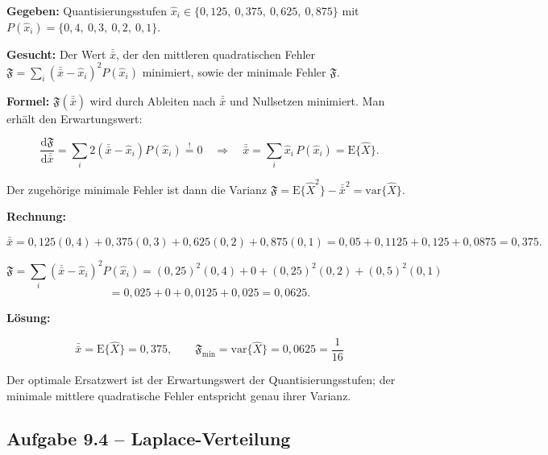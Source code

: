 \begin{beispiel}

\textbf{Gegeben:} Quantisierungsstufen
$\hat{x}_i \in \{0{,}125,\ 0{,}375,\ 0{,}625,\ 0{,}875\}$ mit
$P(\hat{x}_i) = \{0{,}4,\ 0{,}3,\ 0{,}2,\ 0{,}1\}$.

\textbf{Gesucht:} Der Wert $\bar{\bar{x}}$, der den mittleren quadratischen
Fehler $\mathfrak{F} = \sum_i (\bar{\bar{x}} - \hat{x}_i)^2 P(\hat{x}_i)$
minimiert, sowie der minimale Fehler $\mathfrak{F}$.

\textbf{Formel:} $\mathfrak{F}(\bar{\bar{x}})$ wird durch Ableiten nach
$\bar{\bar{x}}$ und Nullsetzen minimiert. Man erhält den Erwartungswert:

$$
\frac{\mathrm{d}\mathfrak{F}}{\mathrm{d}\bar{\bar{x}}}
= \sum_i 2(\bar{\bar{x}} - \hat{x}_i) P(\hat{x}_i) \overset{!}{=} 0
\quad\Longrightarrow\quad
\bar{\bar{x}} = \sum_i \hat{x}_i\, P(\hat{x}_i) = \mathrm{E}\{\hat{X}\}.
$$

Der zugehörige minimale Fehler ist dann die Varianz
$\mathfrak{F} = \mathrm{E}\{\hat{X}^2\} - \bar{\bar{x}}^2 = \mathrm{var}\{\hat{X}\}$.

\textbf{Rechnung:}

$$
\bar{\bar{x}} = 0{,}125(0{,}4) + 0{,}375(0{,}3) + 0{,}625(0{,}2) + 0{,}875(0{,}1)
= 0{,}05 + 0{,}1125 + 0{,}125 + 0{,}0875 = 0{,}375.
$$

$$
\mathfrak{F} = \sum_i (\bar{\bar{x}} - \hat{x}_i)^2 P(\hat{x}_i)
= (0{,}25)^2 (0{,}4) + 0 + (0{,}25)^2 (0{,}2) + (0{,}5)^2 (0{,}1)
$$
$$
= 0{,}025 + 0 + 0{,}0125 + 0{,}025 = 0{,}0625.
$$

\textbf{Lösung:}

$$
\boxed{\;\bar{\bar{x}} = \mathrm{E}\{\hat{X}\} = 0{,}375, \qquad
\mathfrak{F}_{\min} = \mathrm{var}\{\hat{X}\} = 0{,}0625 = \frac{1}{16}\;}
$$

Der optimale Ersatzwert ist der Erwartungswert der Quantisierungsstufen; der
minimale mittlere quadratische Fehler entspricht genau ihrer Varianz.

\end{beispiel}

\subsection*{Aufgabe 9.4 – Laplace-Verteilung}

